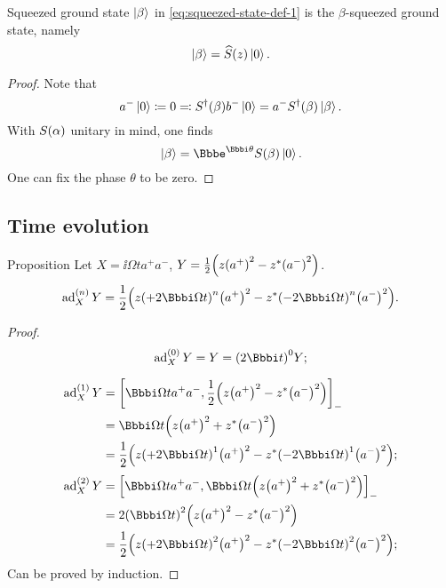 \begin{namedthm}{Squeezed ground state}
	$\Ket{\beta}$ in \cref{eq:squeezed-state-def-1} is the $\beta$-squeezed 
ground state, namely
\begin{equation}
	\Ket{\beta} = {\widehat{S}}\mathopen{}\left(z\right)\mathclose{}\Ket{0}.
\end{equation}

\end{namedthm} %
\begin{proof}
Note that
\begin{equation}
a^-\Ket{0} \coloneqq 0 \eqqcolon {S^\dagger}\mathopen{}\left(\beta\right)\mathclose{} b^- \Ket{0}
= a^- {S^\dagger}\mathopen{}\left(\beta\right)\mathclose{} \Ket{\beta}.
\end{equation}
With ${S}\mathopen{}\left(\alpha\right)\mathclose{}$ unitary in mind, one finds
\begin{equation}
\Ket{\beta} = \ee^{\ii\theta}\rfun{S}{\beta}\Ket{0}.
\end{equation}
One can fix the phase $\theta$ to be zero.
\end{proof}


\subsection{Time evolution}

\begin{namedthm}{Proposition}
	Let $X = \ii\Omega t a^+ a^-$, $Y = \frac{1}{2}{\left(z 
		{\left(a^+\right)}^2 - z^*{\left(a^-\right)}^2\right)}$.
	\begin{equation}
		\ad_X^{(n)}Y = \frac{1}{2}\rbr{z \rbr{+2\ii\Omega t}^n
		\rbr{a^+}^2 - z^*\rbr{-2\ii\Omega t}^n\rbr{a^-}^2}.
	\end{equation}

\end{namedthm} %
\begin{proof}
\begin{equation}
\ad_X^{(0)}Y = Y = \rbr{2\ii t}^0 Y;
\end{equation}

\begin{align}
	\ad_X^{(1)}Y &= \sbr{\ii\Omega t a^+ a^-, \frac{1}{2}\rbr{z 
		\rbr{a^+}^2 - z^*\rbr{a^-}^2}}_- \nonumber \\
&= \ii \Omega t\rbr{z\rbr{a^+}^2 + z^*\rbr{a^-}^2} \nonumber \\
&= \frac{1}{2}\rbr{z \rbr{+2\ii\Omega t}^1
		\rbr{a^+}^2 - z^*\rbr{-2\ii\Omega t}^1\rbr{a^-}^2};
\end{align}
\begin{align}
	\ad_X^{(2)}Y &= \sbr{\ii\Omega t a^+ a^-, \ii \Omega t 
\rbr{z\rbr{a^+}^2 + z^*\rbr{a^-}^2} }_- \nonumber \\
&= 2\rbr{\ii \Omega t}^2\rbr{ z\rbr{a^+}^2 - z^*\rbr{a^-}^2} \nonumber \\
&= \frac{1}{2}\rbr{z \rbr{+2\ii\Omega t}^2
		\rbr{a^+}^2 - z^*\rbr{-2\ii\Omega t}^2\rbr{a^-}^2};
\end{align}
Can be proved by induction.
\end{proof}

